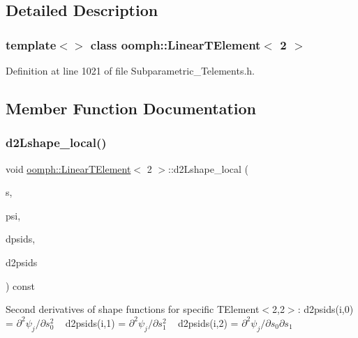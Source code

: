 \subsection{Detailed Description}
\subsubsection*{template$<$$>$\newline
class oomph\+::\+Linear\+T\+Element$<$ 2 $>$}



Definition at line 1021 of file Subparametric\+\_\+\+Telements.\+h.



\subsection{Member Function Documentation}
\mbox{\label{classoomph_1_1LinearTElement_3_012_01_4_a0deccf130233fc497906f9b48608045e}} 
\subsubsection{\texorpdfstring{d2\+Lshape\+\_\+local()}{d2Lshape\_local()}}
{\footnotesize\ttfamily void \hyperlink{classoomph_1_1LinearTElement}{oomph\+::\+Linear\+T\+Element}$<$ 2 $>$\+::d2\+Lshape\+\_\+local (\begin{DoxyParamCaption}\item[{const \hyperlink{classoomph_1_1Vector}{Vector}$<$ double $>$ \&}]{s,  }\item[{\hyperlink{classoomph_1_1Shape}{Shape} \&}]{psi,  }\item[{\hyperlink{classoomph_1_1DShape}{D\+Shape} \&}]{dpsids,  }\item[{\hyperlink{classoomph_1_1DShape}{D\+Shape} \&}]{d2psids }\end{DoxyParamCaption}) const\hspace{0.3cm}{\ttfamily [inline]}}

Second derivatives of shape functions for specific T\+Element$<$2,2$>$\+: d2psids(i,0) = $ \partial^2 \psi_j / \partial s_0^2 $ ~\newline
d2psids(i,1) = $ \partial^2 \psi_j / \partial s_1^2 $ ~\newline
d2psids(i,2) = $ \partial^2 \psi_j / \partial s_0 \partial s_1 $ ~\newline
 

